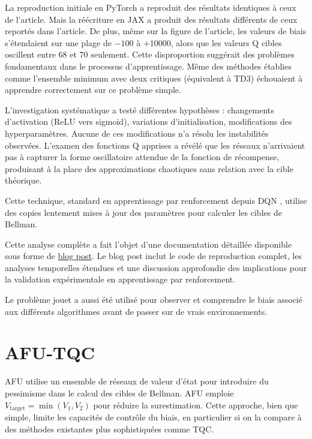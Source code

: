 \documentclass[a4paper, 12pt]{report}
\begin{document}
    La reproduction initiale en PyTorch a reproduit des résultats identiques à
    ceux de l'article. Mais la réécriture en JAX a produit des résultats
    différents de ceux reportés dans l'article. De plus, même sur la figure de
    l'article, les valeurs de biais s'étendaient sur une plage de $-100$ à
    $+10000$, alors que les valeurs Q cibles oscillent entre $68$ et $70$
    seulement. Cette disproportion suggérait des problèmes fondamentaux dans le
    processus d'apprentissage. Même des méthodes établies comme l'ensemble
    minimum avec deux critiques (équivalent à TD3) échouaient à apprendre
    correctement sur ce problème simple.

    L'investigation systématique a testé différentes hypothèses : changements
    d'activation (ReLU vers sigmoid), variations d'initialisation,
    modifications des hyperparamètres. Aucune de ces modifications n'a résolu
    les instabilités observées. L'examen des fonctions Q apprises a révélé que
    les réseaux n'arrivaient pas à capturer la forme oscillatoire attendue de
    la fonction de récompense, produisant à la place des approximations
    chaotiques sans relation avec la cible théorique.

    Cette technique, standard en apprentissage par renforcement depuis DQN
    \cite{mnih2015humanlevelcontroldeepreinforcement}, utilise des copies
    lentement mises à jour des paramètres pour calculer les cibles de Bellman.

    Cette analyse complète a fait l'objet d'une documentation détaillée
    disponible sous forme de \href{https://chambaz.xyz/blog/tqc-figure/}{blog
    post}. Le blog post inclut le code de reproduction complet, les analyses
    temporelles étendues et une discussion approfondie des implications pour
    la validation expérimentale en apprentissage par renforcement.

    Le problème jouet a aussi été utilisé pour observer et comprendre le biais
    associé aux différents algorithmes avant de passer sur de vrais
    environnements.

    \section{AFU-TQC}

    AFU utilise un ensemble de réseaux de valeur d'état pour introduire du
    pessimisme dans le calcul des cibles de Bellman. AFU emploie
    $V_{\text{target}} = \min(V_1, V_2)$ pour réduire la surestimation. Cette
    approche, bien que simple, limite les capacités de contrôle du biais, en
    particulier si on la compare à des méthodes existantes plus sophistiquées
    comme TQC.
\end{document}
